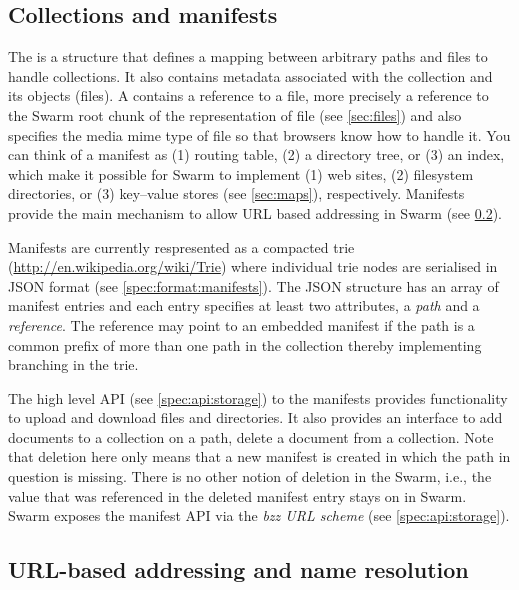 \subsection{Collections and manifests}\label{sec:collections}

The  is a structure that defines a mapping between arbitrary paths and files to handle collections. It also contains metadata associated with the collection and its objects (files). A  contains a reference to a file, more precisely a reference to the Swarm root chunk of the representation of file (see \ref{sec:files}) and also specifies the media mime type of file so that browsers know how to handle it. You can think of a manifest as (1) routing table, (2) a directory tree, or  (3) an index, which make it possible for Swarm to implement (1) web sites, (2) filesystem directories, or (3) key--value stores (see \ref{sec:maps}), respectively. Manifests provide the main mechanism to allow URL based addressing in Swarm (see \ref{sec:urls}). 

Manifests are currently respresented as a compacted trie (\url{http://en.wikipedia.org/wiki/Trie}) where individual trie nodes are  serialised in JSON format (see \ref{spec:format:manifests}). The JSON structure has an array of manifest entries and each entry specifies at least two attributes, a \emph{path} and a \emph{reference}. The reference may point to an embedded manifest if the path is a common prefix of more than one path in the collection thereby implementing branching in the trie. 

The high level API (see \ref{spec:api:storage}) to the manifests provides functionality to upload and download  files and directories. It also provides an interface to add documents to a collection on a path, delete a document from a collection. Note that deletion here only means that a new manifest is created in which the path in question is missing. There is no other notion of deletion in the Swarm, i.e., the value that was referenced in the deleted manifest entry stays on in Swarm. Swarm exposes the manifest API via the \emph{bzz URL scheme} (see \ref{spec:api:storage}).

\subsection{URL-based addressing and name resolution}\label{sec:urls}


